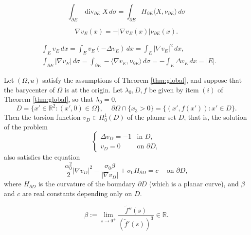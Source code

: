 \documentclass[10pt,a4paper]{amsart}
\newcommand{\R}{{\mathbb R}}
\renewcommand{\div}{\operatorname{div}} %
\newcommand{\grad}{\nabla}
\newcommand{\la}{\langle}
\newcommand{\lm}{\lambda}
\newcommand{\pa}{\partial}
\newcommand{\ra}{\rangle}
\begin{document}
\begin{equation}\label{eq:tang.divergence}
\int_{\pa E} \div_{\pa E} X \, d\sigma
= \int_{\pa E} H_{\pa E} \la X, \nu_{\pa E} \ra \, d\sigma
\end{equation}

\begin{equation}\label{torsion.gradient}
\nabla v_E(x) = -|\nabla v_E(x)| \nu_{\pa E}(x).
\end{equation}

\begin{align}
& \int_E v_E \, dx = \int_E v_E (-\Delta v_E) \, dx 
= \int_E |\grad v_E|^2 \, dx, 
\label{torsion.integral} 
\\ 
& \int_{\pa E} |\nabla v_E| \, d\sigma 
= \int_{\pa E} - \la \grad v_E, \nu_{\pa E} \ra \, d\sigma 
= - \int_E \Delta v_E \, dx 
= |E|. 
\label{torsion.gradient.integral}
\end{align}

\begin{theorem}
\label{thm:4.1}
Let $(\Omega,u)$ satisfy the assumptions of Theorem \ref{thm:global}, 
and suppose that the barycenter of $\Omega$ is at the origin. 
Let $\lm_0, D, f$ be given by item $(i)$ of Theorem \ref{thm:global}, 
so that $\lm_0 = 0$, 
\begin{equation} \label{eq:omega.is.graph}
D = \{ x' \in \R^2 : (x',0) \in \Omega \}, 
\quad \ 
\pa \Omega \cap \{x_3>0\} = \{(x', f(x')) : x' \in D\}.
\end{equation}
Then the torsion function $v_D \in H^1_0(D)$ of the planar set $D$, 
that is, the solution of the problem 
\begin{equation} \label{eq:torsion} 
\begin{cases}
\Delta v_D = -1 & \text{in } D, \\
v_D=0 & \text{on } \pa D,
\end{cases}
\end{equation}
also satisfies the equation 
\begin{equation} \label{eq:over.determined}
\frac{\alpha_0^2}{2}  | \nabla v_D|^{2}  
- \frac{ \sigma_0 \beta }{ | \nabla v_D| }  
+ \sigma_0 H_{\pa D}
= c 
\quad \ \text{on } \pa D,
\end{equation}
where $H_{\pa D}$ is the curvature of the boundary $\pa D$ (which is a planar curve),
and $\beta$ and $c$ are real constants depending only on $D$.
\end{theorem}

\begin{equation}\label{eq:defn.beta}
\beta := \lim_{s \to 0^+} \frac{ \tilde f''(s) }{ (\tilde f'(s))^3 } \in \R.
\end{equation}
\end{document}
